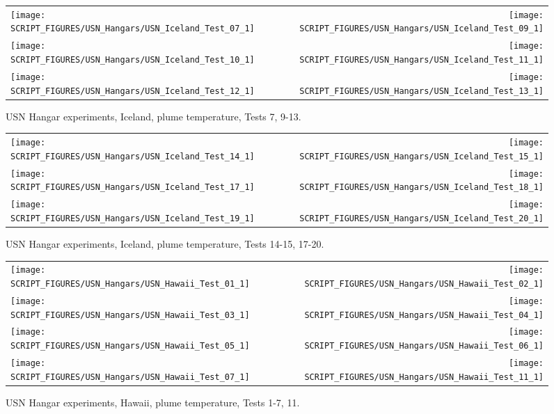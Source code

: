 \newpage

\begin{figure}[p]
\begin{tabular*}{\textwidth}{l@{\extracolsep{\fill}}r}
\texttt{[image: SCRIPT\_FIGURES/USN\_Hangars/USN\_Iceland\_Test\_07\_1]} &
\texttt{[image: SCRIPT\_FIGURES/USN\_Hangars/USN\_Iceland\_Test\_09\_1]} \\
\texttt{[image: SCRIPT\_FIGURES/USN\_Hangars/USN\_Iceland\_Test\_10\_1]} &
\texttt{[image: SCRIPT\_FIGURES/USN\_Hangars/USN\_Iceland\_Test\_11\_1]} \\
\texttt{[image: SCRIPT\_FIGURES/USN\_Hangars/USN\_Iceland\_Test\_12\_1]} &
\texttt{[image: SCRIPT\_FIGURES/USN\_Hangars/USN\_Iceland\_Test\_13\_1]} \\
\end{tabular*}
\caption[USN Hangar experiments, Iceland, plume temperature, Tests 7, 9-13]
{USN Hangar experiments, Iceland, plume temperature, Tests 7, 9-13.}
\label{USN_Plume_Iceland_2}
\end{figure}

\begin{figure}[p]
\begin{tabular*}{\textwidth}{l@{\extracolsep{\fill}}r}
\texttt{[image: SCRIPT\_FIGURES/USN\_Hangars/USN\_Iceland\_Test\_14\_1]} &
\texttt{[image: SCRIPT\_FIGURES/USN\_Hangars/USN\_Iceland\_Test\_15\_1]} \\
\texttt{[image: SCRIPT\_FIGURES/USN\_Hangars/USN\_Iceland\_Test\_17\_1]} &
\texttt{[image: SCRIPT\_FIGURES/USN\_Hangars/USN\_Iceland\_Test\_18\_1]} \\
\texttt{[image: SCRIPT\_FIGURES/USN\_Hangars/USN\_Iceland\_Test\_19\_1]} &
\texttt{[image: SCRIPT\_FIGURES/USN\_Hangars/USN\_Iceland\_Test\_20\_1]} \\
\end{tabular*}
\caption[USN Hangar experiments, Iceland, plume temperature, Tests 14-15, 17-20]
{USN Hangar experiments, Iceland, plume temperature, Tests 14-15, 17-20.}
\label{USN_Plume_Iceland_3}
\end{figure}

\begin{figure}[p]
\begin{tabular*}{\textwidth}{l@{\extracolsep{\fill}}r}
\texttt{[image: SCRIPT\_FIGURES/USN\_Hangars/USN\_Hawaii\_Test\_01\_1]} &
\texttt{[image: SCRIPT\_FIGURES/USN\_Hangars/USN\_Hawaii\_Test\_02\_1]} \\
\texttt{[image: SCRIPT\_FIGURES/USN\_Hangars/USN\_Hawaii\_Test\_03\_1]} &
\texttt{[image: SCRIPT\_FIGURES/USN\_Hangars/USN\_Hawaii\_Test\_04\_1]} \\
\texttt{[image: SCRIPT\_FIGURES/USN\_Hangars/USN\_Hawaii\_Test\_05\_1]} &
\texttt{[image: SCRIPT\_FIGURES/USN\_Hangars/USN\_Hawaii\_Test\_06\_1]} \\
\texttt{[image: SCRIPT\_FIGURES/USN\_Hangars/USN\_Hawaii\_Test\_07\_1]} &
\texttt{[image: SCRIPT\_FIGURES/USN\_Hangars/USN\_Hawaii\_Test\_11\_1]}
\end{tabular*}
\caption[USN Hangar experiments, Hawaii, plume temperature, Tests 1-7, 11]
{USN Hangar experiments, Hawaii, plume temperature, Tests 1-7, 11.}
\label{USN_Plume_Hawaii}
\end{figure}

